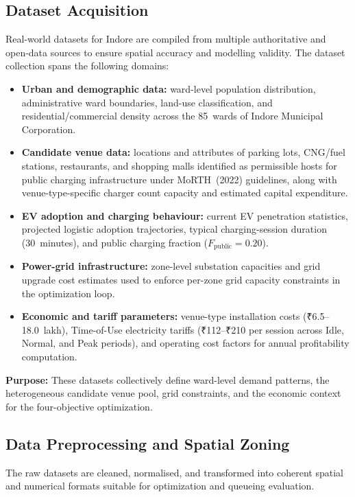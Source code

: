 \clearpage

\subsection{Dataset Acquisition}
Real-world datasets for Indore are compiled from multiple authoritative and
open-data sources to ensure spatial accuracy and modelling validity. The
dataset collection spans the following domains:

\begin{itemize}
    \item \textbf{Urban and demographic data:} ward-level population
          distribution, administrative ward boundaries, land-use
          classification, and residential/commercial density across
          the 85~wards of Indore Municipal Corporation.
    \item \textbf{Candidate venue data:} locations and attributes of
          parking lots, CNG/fuel stations, restaurants, and shopping
          malls identified as permissible hosts for public charging
          infrastructure under MoRTH~(2022) guidelines, along with
          venue-type-specific charger count capacity and estimated
          capital expenditure.
    \item \textbf{EV adoption and charging behaviour:} current EV
          penetration statistics, projected logistic adoption
          trajectories, typical charging-session duration (30~minutes),
          and public charging fraction ($F_{\text{public}} = 0.20$).
    \item \textbf{Power-grid infrastructure:} zone-level substation
          capacities and grid upgrade cost estimates used to enforce
          per-zone grid capacity constraints in the optimization loop.
    \item \textbf{Economic and tariff parameters:} venue-type
          installation costs (₹6.5--18.0~lakh), Time-of-Use electricity
          tariffs (₹112--₹210 per session across Idle, Normal, and
          Peak periods), and operating cost factors for annual
          profitability computation.
\end{itemize}

\noindent\textbf{Purpose:} These datasets collectively define ward-level
demand patterns, the heterogeneous candidate venue pool, grid constraints,
and the economic context for the four-objective optimization.

\subsection{Data Preprocessing and Spatial Zoning}
The raw datasets are cleaned, normalised, and transformed into coherent
spatial and numerical formats suitable for optimization and queueing
evaluation.

